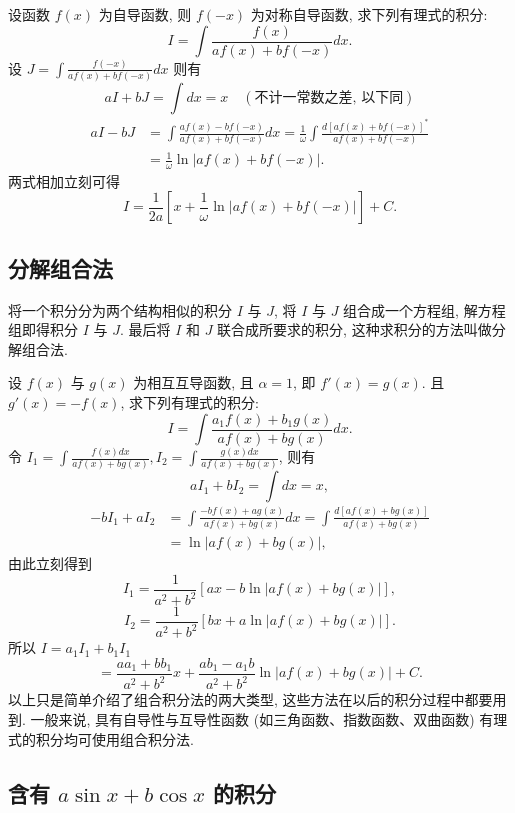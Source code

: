 \documentclass[lang=cn,newtx,10pt,scheme=chinese]{elegantbook}
\renewcommand{\textbf}[1]{\text{\heiti #1}}
\begin{document}
\textbf{例 1} 设函数 $f(x)$ 为自导函数, 则 $f(-x)$ 为对称自导函数, 求下列有理式的积分:
$$
I = \int \frac{f(x)}{a f(x) + b f(-x)} dx.
$$
\textbf{解} 设 $J = \int \frac{f(-x)}{a f(x) + b f(-x)} dx$ 则有
$$
aI + bJ = \int dx = x \quad (\text{不计一常数之差, 以下同})
$$
$$
\begin{aligned}
aI - bJ &= \int \frac{a f(x) - b f(-x)}{a f(x) + b f(-x)} dx = \frac{1}{\omega} \int \frac{d[a f(x) + b f(-x)]^*}{a f(x) + b f(-x)} \\
&= \frac{1}{\omega} \ln|a f(x) + b f(-x)|.
\end{aligned}
$$
两式相加立刻可得
$$
I = \frac{1}{2a} [x + \frac{1}{\omega} \ln|a f(x) + b f(-x)|] + C.
$$

\subsection{分解组合法}
将一个积分分为两个结构相似的积分 $I$ 与 $J$, 将 $I$ 与 $J$ 组合成一个方程组, 解方程组即得积分 $I$ 与 $J$. 最后将 $I$ 和 $J$ 联合成所要求的积分, 这种求积分的方法叫做分解组合法.

\textbf{例 2} 设 $f(x)$ 与 $g(x)$ 为相互互导函数, 且 $\alpha=1$, 即 $f'(x)=g(x)$. 且 $g'(x)=-f(x)$, 求下列有理式的积分:
$$
I = \int \frac{a_1 f(x) + b_1 g(x)}{a f(x) + b g(x)} dx.
$$
\textbf{解} 令 $I_1 = \int \frac{f(x) dx}{a f(x) + b g(x)}, I_2 = \int \frac{g(x) dx}{a f(x) + b g(x)}$,
则有
$$
a I_1 + b I_2 = \int dx = x,
$$
$$
\begin{aligned}
-b I_1 + a I_2 &= \int \frac{-b f(x) + a g(x)}{a f(x) + b g(x)} dx = \int \frac{d[a f(x) + b g(x)]}{a f(x) + b g(x)} \\
&= \ln|a f(x) + b g(x)|,
\end{aligned}
$$
由此立刻得到
$$
I_1 = \frac{1}{a^2 + b^2} [ax - b \ln|a f(x) + b g(x)|],
$$
$$
I_2 = \frac{1}{a^2 + b^2} [bx + a \ln|a f(x) + b g(x)|].
$$
所以 $I = a_1 I_1 + b_1 I_1$
$$
= \frac{a a_1 + b b_1}{a^2 + b^2} x + \frac{a b_1 - a_1 b}{a^2 + b^2} \ln|a f(x) + b g(x)| + C.
$$
以上只是简单介绍了组合积分法的两大类型, 这些方法在以后的积分过程中都要用到. 一般来说, 具有自导性与互导性函数 (如三角函数、指数函数、双曲函数) 有理式的积分均可使用组合积分法.

\subsection{含有 $a \sin x + b \cos x$ 的积分}
\end{document}
